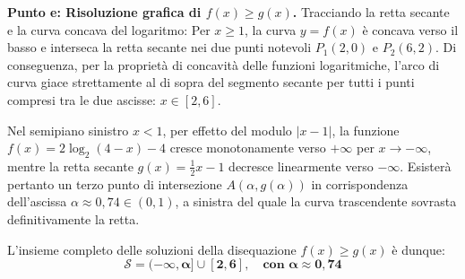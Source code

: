 \documentclass[11pt,a4paper,oneside]{report}
\begin{document}
\begin{dimostrazione}[Svolgimento]
\newpage

\textbf{Punto e: Risoluzione grafica di $f(x) \ge g(x)$.}
Tracciando la retta secante e la curva concava del logaritmo:
Per $x \ge 1$, la curva $y = f(x)$ è concava verso il basso e interseca la retta secante nei due punti notevoli $P_1(2, 0)$ e $P_2(6, 2)$. Di conseguenza, per la proprietà di concavità delle funzioni logaritmiche, l'arco di curva giace strettamente al di sopra del segmento secante per tutti i punti compresi tra le due ascisse: $x \in [2, 6]$.

Nel semipiano sinistro $x < 1$, per effetto del modulo $|x - 1|$, la funzione $f(x) = 2\log_2(4 - x) - 4$ cresce monotonamente verso $+\infty$ per $x \to -\infty$, mentre la retta secante $g(x) = \frac{1}{2}x - 1$ decresce linearmente verso $-\infty$. Esisterà pertanto un terzo punto di intersezione $A(\alpha, g(\alpha))$ in corrispondenza dell'ascissa $\alpha \approx 0{,}74 \in (0, 1)$, a sinistra del quale la curva trascendente sovrasta definitivamente la retta.

L'insieme completo delle soluzioni della disequazione $f(x) \ge g(x)$ è dunque:
\begin{equation}
    \mathbf{\mathcal{S} = (-\infty, \alpha] \cup [2, 6], \quad \text{con } \alpha \approx 0{,}74}
\end{equation}
\end{dimostrazione}
\end{document}
